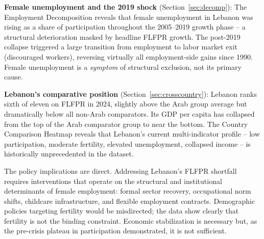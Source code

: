 \documentclass[12pt,a4paper]{article}
\begin{document}
\textbf{Female unemployment and the 2019 shock} (Section~\ref{sec:decomp}): The Employment Decomposition reveals that female unemployment in Lebanon was rising as a share of participation throughout the 2005--2019 growth phase -- a structural deterioration masked by headline FLFPR growth. The post-2019 collapse triggered a large transition from employment to labor market exit (discouraged workers), reversing virtually all employment-side gains since 1990. Female unemployment is a \textit{symptom} of structural exclusion, not its primary cause.

\textbf{Lebanon's comparative position} (Section~\ref{sec:crosscountry}): Lebanon ranks sixth of eleven on FLFPR in 2024, slightly above the Arab group average but dramatically below all non-Arab comparators. Its GDP per capita has collapsed from the top of the Arab comparator group to near the bottom. The Country Comparison Heatmap reveals that Lebanon's current multi-indicator profile -- low participation, moderate fertility, elevated unemployment, collapsed income -- is historically unprecedented in the dataset.

The policy implications are direct. Addressing Lebanon's FLFPR shortfall requires interventions that operate on the structural and institutional determinants of female employment: formal sector recovery, occupational norm shifts, childcare infrastructure, and flexible employment contracts. Demographic policies targeting fertility would be misdirected; the data show clearly that fertility is not the binding constraint. Economic stabilization is necessary but, as the pre-crisis plateau in participation demonstrated, it is not sufficient.

\end{document}
